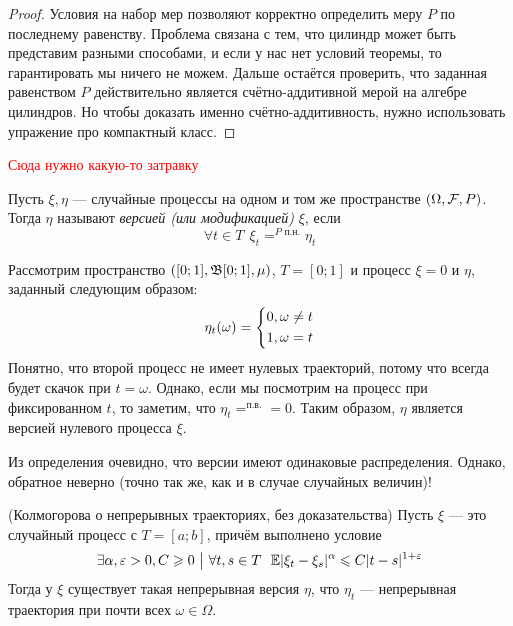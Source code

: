 \begin{proof}
	Условия на набор мер позволяют корректно определить меру $P$ по последнему равенству. Проблема связана с тем, что цилиндр может быть представим разными способами, и если у нас нет условий теоремы, то гарантировать мы ничего не можем. Дальше остаётся проверить, что заданная равенством $P$ действительно является счётно-аддитивной мерой на алгебре цилиндров. Но чтобы доказать именно счётно-аддитивность, нужно использовать упражение про компактный класс.
\end{proof}

\begin{note}
	\textcolor{red}{Сюда нужно какую-то затравку}
\end{note}

\begin{definition}
	Пусть $\xi, \eta$ --- случайные процессы на одном и том же пространстве $(\Omega, \mathcal{F}, P)$. Тогда $\eta$ называют \textit{версией (или модификацией)} $\xi$, если
	\[
	\forall t \in T\ \ \xi_t =^{P\text{ п.н.}} \eta_t
	\]
\end{definition}

\begin{example}
	Рассмотрим пространство $([0; 1], \mathfrak{B}[0; 1], \mu)$, $T = [0; 1]$ и процесс $\xi = 0$ и $\eta$, заданный следующим образом:
	\[
		\eta_t(\omega) = \left\{\begin{aligned}
			&{0, \omega \neq t}
			\\
			&{1, \omega = t}
		\end{aligned}\right.
	\]
	Понятно, что второй процесс не имеет нулевых траекторий, потому что всегда будет скачок при $t = \omega$. Однако, если мы посмотрим на процесс при фиксированном $t$, то заметим, что $\eta_t =^{\text{п.в.}} = 0$. Таким образом, $\eta$ является версией нулевого процесса $\xi$.
\end{example}

\begin{note}
	Из определения очевидно, что версии имеют одинаковые распределения. Однако, обратное неверно (точно так же, как и в случае случайных величин)!
\end{note}

\begin{theorem} (Колмогорова о непрерывных траекториях, без доказательства)
	Пусть $\xi$ --- это случайный процесс с $T = [a; b]$, причём выполнено условие
	\[
		\exists \alpha, \varepsilon > 0, C \geqslant 0 \ \big|\  \forall t, s \in T\ \ \mathbb{E} |\xi_t - \xi_s|^\alpha \leqslant C|t - s|^{1 + \varepsilon}
	\]
	Тогда у $\xi$ существует такая непрерывная версия $\eta$, что $\eta_t$ --- непрерывная траектория при почти всех $\omega \in \Omega$.
\end{theorem}


